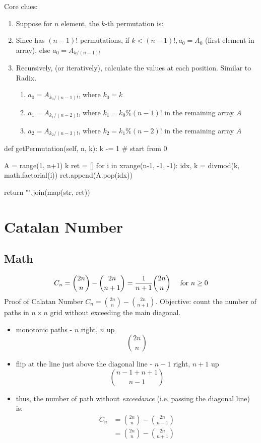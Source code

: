 Core clues:
\begin{enumerate}
\item {}

Suppose for $n$ element, the $k$-th permutation is:

\item {} Since \pyinline{[a1, a3, ..., an-1]} has $(n-1)!$ permutations,
if $k < (n-1)!, a_0 = A_0$ (first element in array), else $a_0 = A_{k/(n-1)!}$

\item Recursively, (or iteratively), calculate the values at each position. Similar to Radix. 
\begin{enumerate}
\item $a_0 = A_{k_0/(n-1)!}$, where $k_0 = k$
\item $a_1 = A_{k_1/(n-2)!}$, where $k_1 = k_0\%(n-1)!$ in the remaining array $A$
\item $a_2 = A_{k_2/(n-3)!}$, where $k_2 = k_1\%(n-2)!$ in the remaining array $A$
\end{enumerate}
\end{enumerate}
\begin{python}
def getPermutation(self, n, k):
    k -= 1  # start from 0

    A = range(1, n+1)
    k %
    ret = []
    for i in xrange(n-1, -1, -1):
        idx, k = divmod(k, math.factorial(i))
        ret.append(A.pop(idx))

    return "".join(map(str, ret))
\end{python}

\section{Catalan Number}\label{section:catalanNumber}
\subsection{Math}
$$
C_n = {2n\choose n} - {2n\choose n+1} = {1\over n+1}{2n\choose n} \quad\text{ for }n\ge 0
$$
 Proof of Calatan Number $C_n ={2n\choose n} - {2n\choose n+1}$. Objective: count the number of paths in $n\times n$ grid without exceeding the main diagonal. 
\begin{itemize}
\begin{figure}[]
    \centerline{\texttt{[image: catalan\_proof]}}
    \caption{Monotonic Paths}
  \label{fig:catalanProof}
\end{figure}
\item monotonic paths - $n$ right, $n$ up
$$
{2n\choose n}
$$
\item flip at the line just above the diagonal line - $n-1$ right, $n+1$ up
$$
{n-1+n+1\choose n-1}
$$
\item thus, the number of path without \textit{exceedance} (i.e. passing the diagonal line) is: 
\begin{align*}
C_n &= {2n\choose n} - {2n\choose n-1}\\ 
&={2n\choose n} - {2n\choose n+1}
\end{align*}
\end{itemize}

